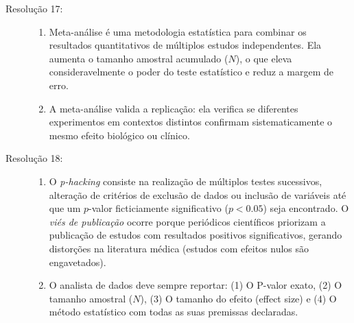 \documentclass[12pt]{article}
\begin{document}
\begin{description}
    \item[Resolução 17:] 
    \begin{enumerate}[label=\alph*)]
        \item Meta-análise é uma metodologia estatística para combinar os resultados quantitativos de múltiplos estudos independentes. Ela aumenta o tamanho amostral acumulado ($N$), o que eleva consideravelmente o poder do teste estatístico e reduz a margem de erro.
        \item A meta-análise valida a replicação: ela verifica se diferentes experimentos em contextos distintos confirmam sistematicamente o mesmo efeito biológico ou clínico.
    \end{enumerate}

    \item[Resolução 18:] 
    \begin{enumerate}[label=\alph*)]
        \item O \textit{p-hacking} consiste na realização de múltiplos testes sucessivos, alteração de critérios de exclusão de dados ou inclusão de variáveis até que um $p$-valor ficticiamente significativo ($p < 0.05$) seja encontrado. O \textit{viés de publicação} ocorre porque periódicos científicos priorizam a publicação de estudos com resultados positivos significativos, gerando distorções na literatura médica (estudos com efeitos nulos são engavetados).
        \item O analista de dados deve sempre reportar: (1) O P-valor exato, (2) O tamanho amostral ($N$), (3) O tamanho do efeito (effect size) e (4) O método estatístico com todas as suas premissas declaradas.
    \end{enumerate}
\end{description}
\end{document}

